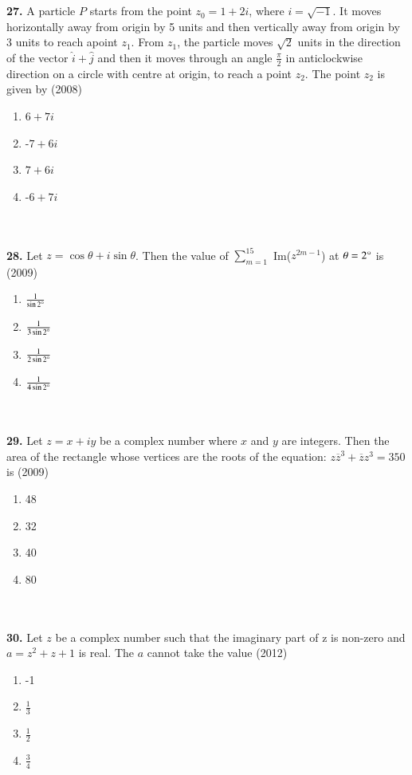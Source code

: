\documentclass[journal,12pt,twocolumn]{IEEEtran}
\theoremstyle{remark}
\begin{document}
\\\\
\textbf{27.} A particle $P$ starts from the point $z_{0}=1+2i$, where $i=\sqrt{-1}$. It moves horizontally away from origin by 5 units and then vertically away from origin by 3 units to reach apoint $z_{1}$. From $z_{1}$, the particle moves $\sqrt{2}$ units in the direction of the vector $\hat{i}+\hat{j}$ and then it moves through an angle $\frac{\pi}{2}$ in anticlockwise direction on a circle with centre at origin, to reach a point $z_{2}$. The point $z_{2}$ is given by \hfill{(2008)}
\begin{enumerate}[label=(\alph*)]
	\item $6+7i$
	\item -$7+6i$
	\item $7+6i$
	\item -$6+7i$
\end{enumerate}
\\\\
\textbf{28.} Let $z=\cos\theta+i\sin\theta$. Then the value of $\sum_{m=1} ^{15}$ Im($z^{2m-1}$) at $\theta=2\degree$ is \hfill{(2009)}
\begin{enumerate}[label=(\alph*)]
	\item $\frac{1}{\sin 2\degree}$
	\item $\frac{1}{3\sin 2\degree}$
	\item $\frac{1}{2\sin 2\degree}$
	\item $\frac{1}{4\sin 2\degree}$
\end{enumerate}
\\\\
\textbf{29.} Let $z=x+iy$ be a complex number where $x$ and $y$ are integers. Then the area of the rectangle whose vertices are the roots of the equation: $z\overline{z}^{3}+\overline{z}z^{3}=350$ is \hfill{(2009)}
\begin{enumerate}[label=(\alph*)]
	\item 48
	\item 32
	\item 40
	\item 80
\end{enumerate}
\\\\
\textbf{30.} Let $z$ be a complex number such that the imaginary part of z is non-zero and $a=z^{2}+z+1$ is real. The $a$ cannot take the value \hfill{(2012)}
\begin{enumerate}[label=(\alph*)]
	\item -1
	\item $\frac{1}{3}$
	\item $\frac{1}{2}$
	\item $\frac{3}{4}$
\end{enumerate}
\end{document}
